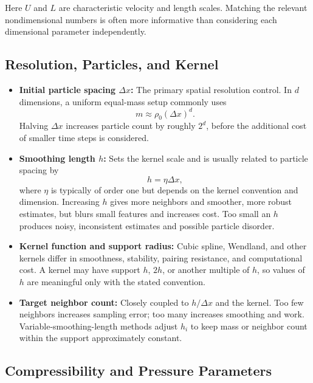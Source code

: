 \documentclass[11pt]{article}
\begin{document}
Here $U$ and $L$ are characteristic velocity and length scales. Matching the
relevant nondimensional numbers is often more informative than considering
each dimensional parameter independently.

\subsection{Resolution, Particles, and Kernel}

\begin{itemize}
    \item \textbf{Initial particle spacing $\Delta x$:} The primary spatial
    resolution control. In $d$ dimensions, a uniform equal-mass setup commonly
    uses
    \begin{equation}
        m \approx \rho_0(\Delta x)^d.
    \end{equation}
    Halving $\Delta x$ increases particle count by roughly $2^d$, before the
    additional cost of smaller time steps is considered.
    \item \textbf{Smoothing length $h$:} Sets the kernel scale and is usually
    related to particle spacing by
    \begin{equation}
        h=\eta\Delta x,
    \end{equation}
    where $\eta$ is typically of order one but depends on the kernel convention
    and dimension. Increasing $h$ gives more neighbors and smoother, more
    robust estimates, but blurs small features and increases cost. Too small an
    $h$ produces noisy, inconsistent estimates and possible particle disorder.
    \item \textbf{Kernel function and support radius:} Cubic spline, Wendland,
    and other kernels differ in smoothness, stability, pairing resistance, and
    computational cost. A kernel may have support $h$, $2h$, or another
    multiple of $h$, so values of $h$ are meaningful only with the stated
    convention.
    \item \textbf{Target neighbor count:} Closely coupled to $h/\Delta x$ and
    the kernel. Too few neighbors increases sampling error; too many increases
    smoothing and work. Variable-smoothing-length methods adjust $h_i$ to keep
    mass or neighbor count within the support approximately constant.
\end{itemize}

\subsection{Compressibility and Pressure Parameters}
\end{document}
